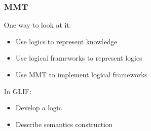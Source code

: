 \begin{frame}
    \frametitle{MMT}
    One way to look at it:
    \begin{itemize}
        \item Use logics to represent knowledge
        \item Use logical frameworks to represent logics
        \item Use MMT to implement logical frameworks
    \end{itemize}

    \vspace{0.7em}
    In GLIF:
    \begin{itemize}
        \item Develop a logic
        \item Describe semantics construction
    \end{itemize}
\end{frame}
